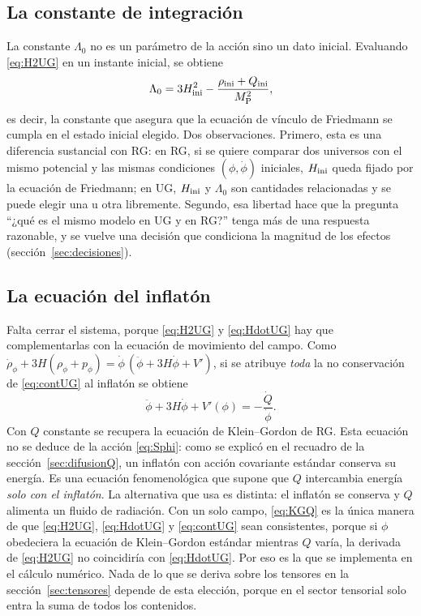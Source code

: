 \subsection{La constante de integración}

La constante $\Lambda_0$ no es un parámetro de la acción sino un dato inicial. Evaluando \eqref{eq:H2UG} en un instante inicial, se obtiene 
\begin{equation}
\Lambda_0=3H_{\rm ini}^2-\frac{\rho_{\rm ini}+Q_{\rm ini}}{M_{\rm P}^2},
\label{eq:Lambda0}
\end{equation}
es decir, la constante que asegura que la ecuación de vínculo de Friedmann se cumpla en el estado inicial elegido. Dos observaciones. Primero, esta es una diferencia sustancial con RG: en RG, si se quiere comparar dos universos con el mismo potencial y las mismas condiciones $(\phi,\dot\phi)$ iniciales, $H_{\rm ini}$ queda fijado por la ecuación de Friedmann; en UG, $H_{\rm ini}$ y $\Lambda_0$ son cantidades relacionadas y se puede elegir una u otra libremente. Segundo, esa libertad hace que la pregunta ``¿qué es el mismo modelo en UG y en RG?'' tenga más de una respuesta razonable, y se vuelve una decisión que condiciona la magnitud de los efectos (sección~\ref{sec:decisiones}).

\subsection{La ecuación del inflatón}
\label{sec:ecinflaton}

Falta cerrar el sistema, porque \eqref{eq:H2UG} y \eqref{eq:HdotUG} hay que complementarlas con la ecuación de movimiento del campo. Como $\dot\rho_\phi+3H(\rho_\phi+p_\phi)=\dot\phi\,(\ddot\phi+3H\dot\phi+V')$, si se atribuye \emph{toda} la no conservación de \eqref{eq:contUG} al inflatón se obtiene 
\begin{equation}
\ddot\phi+3H\dot\phi+V'(\phi)=-\frac{\dot Q}{\dot\phi}.
\label{eq:KGQ}
\end{equation}
Con $Q$ constante se recupera la ecuación de Klein--Gordon de RG. Esta ecuación no se deduce de la acción \eqref{eq:Sphi}: como se explicó en el recuadro de la sección~\ref{sec:difusionQ}, un inflatón con acción covariante estándar conserva su energía. Es una ecuación fenomenológica que supone que $Q$ intercambia energía \emph{solo con el inflatón}. La alternativa que usa \cite{piccirilli23} es distinta: el inflatón se conserva y $Q$ alimenta un fluido de radiación. Con un solo campo, \eqref{eq:KGQ} es la única manera de que \eqref{eq:H2UG}, \eqref{eq:HdotUG} y \eqref{eq:contUG} sean consistentes, porque si $\phi$ obedeciera la ecuación de Klein--Gordon estándar mientras $Q$ varía, la derivada de \eqref{eq:H2UG} no coincidiría con \eqref{eq:HdotUG}. Por eso es la que se implementa en el cálculo numérico. Nada de lo que se deriva sobre los tensores en la sección~\ref{sec:tensores} depende de esta elección, porque en el sector tensorial solo entra la suma de todos los contenidos.

